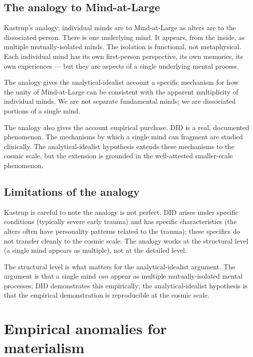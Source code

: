 \subsection{The analogy to Mind-at-Large}

Kastrup's analogy: individual minds are to Mind-at-Large as alters
are to the dissociated person. There is one underlying mind. It
appears, from the inside, as multiple mutually-isolated minds. The
isolation is functional, not metaphysical. Each individual mind has
its own first-person perspective, its own memories, its own
experiences --- but they are aspects of a single underlying
mental process.

The analogy gives the analytical-idealist account a specific
mechanism for how the unity of Mind-at-Large can be consistent with
the apparent multiplicity of individual minds. We are not separate
fundamental minds; we are dissociated portions of a single mind.

The analogy also gives the account empirical purchase. DID is a
real, documented phenomenon. The mechanisms by which a single mind
can fragment are studied clinically. The analytical-idealist
hypothesis extends these mechanisms to the cosmic scale, but the
extension is grounded in the well-attested smaller-scale phenomenon.

\subsection{Limitations of the analogy}

Kastrup is careful to note the analogy is not perfect. DID arises
under specific conditions (typically severe early trauma) and has
specific characteristics (the alters often have personality
patterns related to the trauma); these specifics do not transfer
cleanly to the cosmic scale. The analogy works at the structural
level (a single mind appears as multiple), not at the
detailed level.

The structural level is what matters for the analytical-idealist
argument. The argument is that a single mind \emph{can} appear as
multiple mutually-isolated mental processes; DID demonstrates this
empirically; the analytical-idealist hypothesis is that the
empirical demonstration is reproducible at the cosmic scale.

\section{Empirical anomalies for materialism}
\label{sec:empirical-anomalies}

